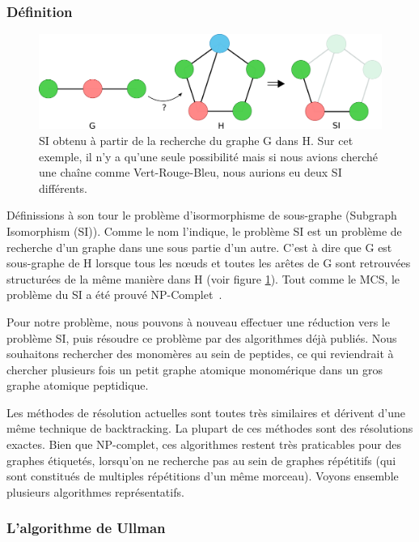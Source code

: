 \label{SI_p}

\subsubsection{Définition}

\begin{figure}[!ht]
  \begin{center}
    \includegraphics[width=450px]{Figures/s2m/MCS-SI/si.png}
    \caption{\label{SI_fig}SI obtenu à partir de la recherche du graphe G dans H.
    Sur cet exemple, il n'y a qu'une seule possibilité mais si nous avions cherché une chaîne comme Vert-Rouge-Bleu, nous aurions eu deux SI différents.}
  \end{center}
\end{figure}

Définissions à son tour le problème d'isormorphisme de sous-graphe (Subgraph Isomorphism (SI)).
Comme le nom l'indique, le problème SI est un problème de recherche d'un graphe dans une sous partie d'un autre.
C'est à dire que G est sous-graphe de H lorsque tous les n\oe{}uds et toutes les arêtes de G sont retrouvées structurées de la même manière dans H (voir figure \ref{SI_fig}).
Tout comme le MCS, le problème du SI a été prouvé NP-Complet~\cite{garey_computers_1979}.

Pour notre problème, nous pouvons à nouveau effectuer une réduction vers le problème SI, puis résoudre ce problème par des algorithmes déjà publiés.
Nous souhaitons rechercher des monomères au sein de peptides, ce qui reviendrait à chercher plusieurs fois un petit graphe atomique monomérique dans un gros graphe atomique peptidique.

Les méthodes de résolution actuelles sont toutes très similaires et dérivent d'une même technique de backtracking.
La plupart de ces méthodes sont des résolutions exactes.
Bien que NP-complet, ces algorithmes restent très praticables pour des graphes étiquetés, lorsqu'on ne recherche pas au sein de graphes répétitifs (qui sont constitués de multiples répétitions d'un même morceau).
Voyons ensemble plusieurs algorithmes représentatifs.


\subsubsection{L'algorithme de Ullman}

